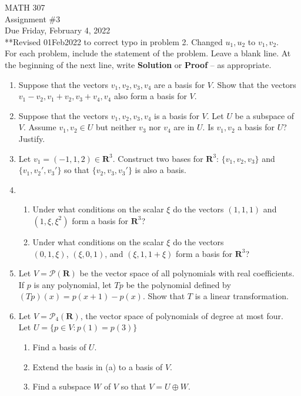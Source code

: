 \documentclass[12pt]{article}
\begin{document}
\noindent MATH 307 \\
Assignment \#3 \\ %
Due Friday, February 4, 2022 \\
**Revised 01Feb2022 to correct typo in problem 2. Changed $u_1, u_2$ to $v_1, v_2$. \\

For each problem, include the statement of the problem. Leave a blank line.  At the beginning of the next line, write \textbf{Solution} or \textbf{Proof} -- as appropriate.

\begin{enumerate}
\item  Suppose that the vectors $v_1, v_2, v_3, v_4$ are a basis for $V$.  Show that the vectors \\
    $v_1-v_2, v_1+v_2, v_3+v_4, v_4$ also form a basis for $V$.

\item   Suppose that the vectors $v_1, v_2, v_3, v_4$ is a basis for $V$.  Let $U$ be a subspace of $V$.  Assume $v_1, v_2 \in U$ but neither $v_3$ nor $v_4$ are in $U$.  Is $v_1, v_2$ a basis for $U$?  Justify.

\item Let $v_1 = (-1,1,2) \in \mathbf{R}^3$.  Construct two bases for $\mathbf{R}^3$:  $\{v_1, v_2,v_3\}$ and $\{v_1, v_2', v_3'\}$ so that $\{v_2, v_3, v_3'\}$ is also a basis.

\item
    \begin{enumerate}
        \item Under what conditions on the scalar $\xi$ do the vectors $(1,1,1)$ and $(1, \xi , \xi^2 )$ form a basis for $\mathbf{R}^3$?
        \item Under what conditions on the scalar $\xi$ do the vectors\\ $(0,1,\xi)$, $(\xi , 0,1 )$, and $(\xi,1,1+\xi)$  form a basis for $\mathbf{R}^3$?
    \end{enumerate}

\item Let $V = \mathcal{P}(\mathbf{R})$ be the vector space of all polynomials with real coefficients.  If $p$ is any polynomial, let $Tp$ be the polynomial defined by $(Tp)(x) = p(x+1) - p(x)$.  Show that $T$ is a linear transformation.

\item Let $V = \mathcal{P}_4(\mathbf{R})$, the vector space of polynomials of degree at most four. \\ Let $U = \{p \in V : p(1)=p(3)\}$
    \begin{enumerate}
        \item Find a basis of $U$.
        \item Extend the basis in (a) to a basis of $V$.
        \item Find a subspace $W$ of $V$ so that $V=U \oplus W$.
    \end{enumerate}


\end{enumerate}
\end{document}
